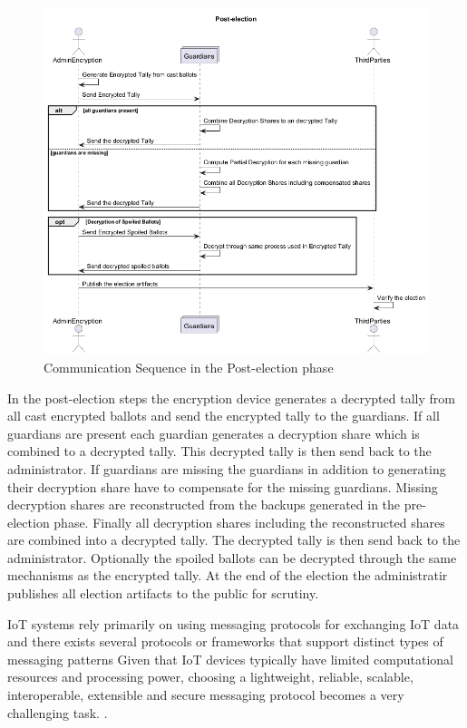 \begin{figure}
    \centering
    \includegraphics[width=\textwidth]{abbildungen/Diagramme/communication-seq2.png}
    \caption{Communication Sequence in the Post-election phase}
    \label{Fig:comm-post}
\end{figure}

In the post-election steps the encryption device generates a decrypted tally from all cast encrypted ballots and send the encrypted tally to the guardians. If all guardians are present each guardian generates a decryption share which is combined to a decrypted tally. This decrypted tally is then send back to the administrator. If guardians are missing the guardians in addition to generating their decryption share have to compensate for the missing guardians. Missing decryption shares are reconstructed from the backups generated in the pre-election phase. Finally all decryption shares including the reconstructed shares are combined into a decrypted tally. The decrypted tally is then send back to the administrator. Optionally the spoiled ballots can be decrypted through the same mechanisms as the encrypted tally. At the end of the election the administratir publishes all election artifacts to the public for scrutiny.


IoT systems rely primarily on using messaging protocols for exchanging
IoT data and there exists several protocols or frameworks that support distinct types of messaging patterns 
Given that IoT devices typically have limited computational resources and processing power, choosing a
lightweight, reliable, scalable, interoperable, extensible and secure messaging protocol becomes a very
challenging task. \cite[1]{protocols}.


